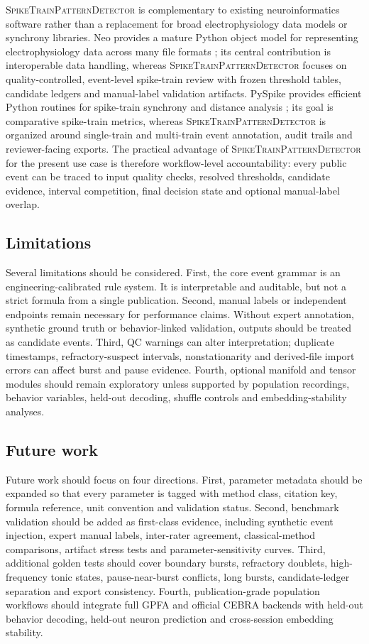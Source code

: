 \documentclass[pdflatex,sn-apa]{sn-jnl}
\newcommand{\stpd}{\textsc{SpikeTrainPatternDetector}}
\begin{document}
\stpd{} is complementary to existing neuroinformatics software rather than a replacement for broad electrophysiology data models or synchrony libraries. Neo provides a mature Python object model for representing electrophysiology data across many file formats \citep{Garcia2014}; its central contribution is interoperable data handling, whereas \stpd{} focuses on quality-controlled, event-level spike-train review with frozen threshold tables, candidate ledgers and manual-label validation artifacts. PySpike provides efficient Python routines for spike-train synchrony and distance analysis \citep{Mulansky2016}; its goal is comparative spike-train metrics, whereas \stpd{} is organized around single-train and multi-train event annotation, audit trails and reviewer-facing exports. The practical advantage of \stpd{} for the present use case is therefore workflow-level accountability: every public event can be traced to input quality checks, resolved thresholds, candidate evidence, interval competition, final decision state and optional manual-label overlap.

\subsection{Limitations}

Several limitations should be considered. First, the core event grammar is an engineering-calibrated rule system. It is interpretable and auditable, but not a strict formula from a single publication. Second, manual labels or independent endpoints remain necessary for performance claims. Without expert annotation, synthetic ground truth or behavior-linked validation, outputs should be treated as candidate events. Third, QC warnings can alter interpretation; duplicate timestamps, refractory-suspect intervals, nonstationarity and derived-file import errors can affect burst and pause evidence. Fourth, optional manifold and tensor modules should remain exploratory unless supported by population recordings, behavior variables, held-out decoding, shuffle controls and embedding-stability analyses.

\subsection{Future work}

Future work should focus on four directions. First, parameter metadata should be expanded so that every parameter is tagged with method class, citation key, formula reference, unit convention and validation status. Second, benchmark validation should be added as first-class evidence, including synthetic event injection, expert manual labels, inter-rater agreement, classical-method comparisons, artifact stress tests and parameter-sensitivity curves. Third, additional golden tests should cover boundary bursts, refractory doublets, high-frequency tonic states, pause-near-burst conflicts, long bursts, candidate-ledger separation and export consistency. Fourth, publication-grade population workflows should integrate full GPFA and official CEBRA backends with held-out behavior decoding, held-out neuron prediction and cross-session embedding stability.
\end{document}
